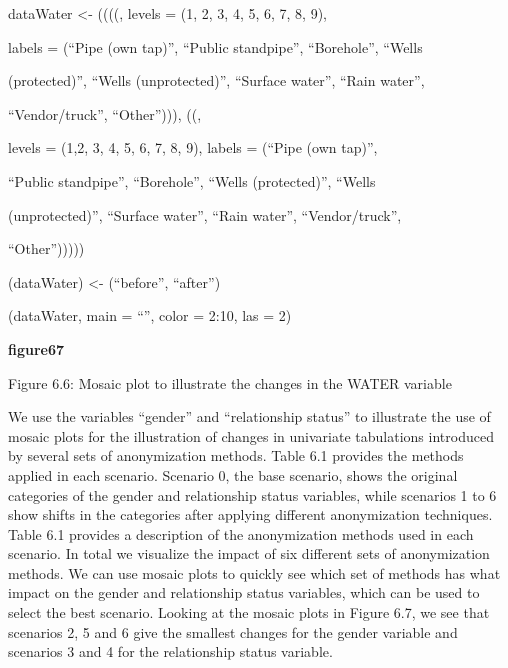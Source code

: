\documentclass[letterpaper,10pt,english]{sphinxmanual}
\begin{document}
\begin{DUlineblock}{0em}
\item[] 
\item[] dataWater \textless{}-
((((,
levels = (1, 2, 3, 4, 5, 6, 7, 8, 9),
\item[] labels = (“Pipe (own tap)”, “Public standpipe”, “Borehole”,
“Wells
\item[] (protected)”, “Wells (unprotected)”, “Surface water”, “Rain water”,
\item[] “Vendor/truck”, “Other”))),
((,
\item[] levels = (1,2, 3, 4, 5, 6, 7, 8, 9), labels = (“Pipe
(own tap)”,
\item[] “Public standpipe”, “Borehole”, “Wells (protected)”, “Wells
\item[] (unprotected)”, “Surface water”, “Rain water”, “Vendor/truck”,
\item[] “Other”)))))
\end{DUlineblock}

(dataWater) \textless{}- (“before”, “after”)

\begin{DUlineblock}{0em}
\item[] 
\item[] (dataWater, main = “”, color = 2:10, las = 2)
\end{DUlineblock}

{\color{red}\bfseries{}\textbar{}figure67\textbar{}}

Figure 6.6: Mosaic plot to illustrate the changes in the WATER variable

We use the variables “gender” and “relationship status” to illustrate
the use of mosaic plots for the illustration of changes in univariate
tabulations introduced by several sets of anonymization methods. Table
6.1 provides the methods applied in each scenario. Scenario 0, the base
scenario, shows the original categories of the gender and relationship
status variables, while scenarios 1 to 6 show shifts in the categories
after applying different anonymization techniques. Table 6.1 provides a
description of the anonymization methods used in each scenario. In total
we visualize the impact of six different sets of anonymization methods.
We can use mosaic plots to quickly see which set of methods has what
impact on the gender and relationship status variables, which can be
used to select the best scenario. Looking at the mosaic plots in Figure
6.7, we see that scenarios 2, 5 and 6 give the smallest changes for the
gender variable and scenarios 3 and 4 for the relationship status
variable.
\end{document}
